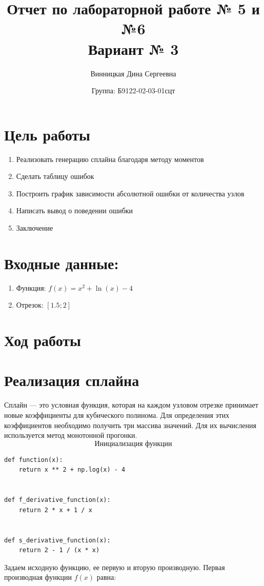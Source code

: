 \documentclass{article}
\title{Отчет по лабораторной работе № 5 и №6\\ Вариант № 3}
\author{Винницкая Дина Сергеевна}
\date{Группа: Б9122-02-03-01сцт}
\begin{document}
\maketitle
\section*{Цель работы}
\begin{enumerate}
    \item Реализовать генерацию сплайна благодаря методу моментов
    \item Сделать таблицу ошибок
    \item Построить график зависимости абсолютной ошибки от количества узлов
    \item Написать вывод о поведении ошибки 
    \item Заключение
\end{enumerate}

\section*{Входные данные:}
\begin{enumerate}
    \item Функция: $f(x) = x^2 + \ln(x) - 4$
    \item Отрезок: $[1.5; 2]$
\end{enumerate}

\section*{Ход работы}
\section*{Реализация сплайна}
Сплайн — это условная функция, которая на каждом узловом отрезке принимает новые коэффициенты для кубического полинома. Для определения этих коэффициентов необходимо получить три массива значений. Для их вычисления используется $\textbf{метод монотонной прогонки}$. \\
$$\textbf{Инициализация функции}$$
\begin{lstlisting}
def function(x):
    return x ** 2 + np.log(x) - 4


def f_derivative_function(x):
    return 2 * x + 1 / x


def s_derivative_function(x):
    return 2 - 1 / (x * x)
\end{lstlisting}
 Задаем исходную функцию, ее первую и вторую производную.
 Первая производная функции \( f(x) \) равна:
\end{document}
